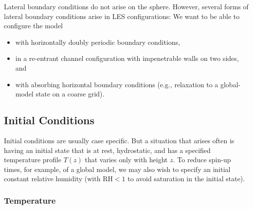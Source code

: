 \documentclass{report}
\begin{document}
{Lateral boundary conditions do not arise on the sphere. However, several forms of lateral boundary conditions arise in LES configurations: We want to be able to configure the model
\begin{itemize}
    \item with horizontally doubly periodic boundary conditions,
    \item in a re-entrant channel configuration with impenetrable walls on two sides, and 
    \item with absorbing horizontal boundary conditions (e.g., relaxation to a global-model state on a coarse grid). 
\end{itemize}

\subsection{Initial Conditions}\label{s:initial_conditions}

Initial conditions are usually case specific. But a situation that arises often is having an initial state that is at rest, hydrostatic, and has a specified temperature profile $T(z)$ that varies only with height $z$. To reduce spin-up times, for example, of a global model, we may also wish to specify an initial constant relative humidity (with $\mathrm{RH} < 1$ to avoid saturation in the initial state).

\subsubsection{Temperature}

}
\end{document}

